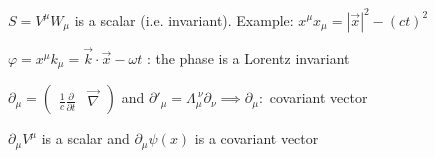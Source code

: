 \begin{squishlist}
\item $S = V^{\mu}W_{\mu}$ is a scalar (i.e. invariant). Example: $x^{\mu}x_{\mu} =  |\vec{x}|^2 -(ct)^2$

\item $\varphi = x^\mu k_\mu =  \vec{k}\cdot\vec{x}-\omega t $ : the phase is a Lorentz invariant 


\item $\partial_{\mu} = 
\begin{pmatrix}
\frac{1}{c} \frac{\partial}{\partial t} &
\vec{\nabla}
\end{pmatrix}$ and $\partial'_{\mu} = \Lambda^{\ \nu}_{\mu} \partial_{\nu} \implies \partial_{\mu} :$ covariant vector

\item $\partial_{\mu} V^{\mu}$ is a scalar and $\partial_{\mu} \psi(x) $ is a covariant vector
\end{squishlist}
